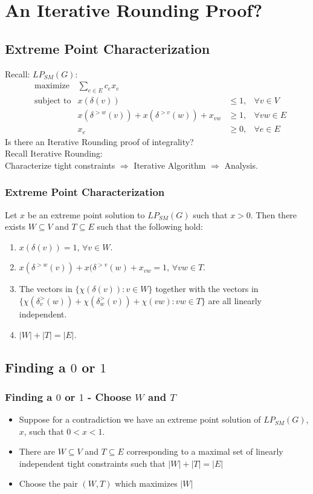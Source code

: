 \documentclass{beamer}
\begin{document}
\section{An Iterative Rounding Proof?}
\subsection{Extreme Point Characterization}
\begin{frame}
Recall: $LP_{SM}(G)$:
\begin{align*}
&\text{maximize} &\sum_{e \in E} c_e x_e \\
&\text{subject to} &x(\delta(v)) &\leq 1, &\forall v \in V\\
& &x(\delta^{>w}(v)) + x(\delta^{>v}(w)) + x_{vw} &\geq 1, &\forall vw \in E\\
& &x_e &\geq 0, &\forall e \in E
\end{align*}
Is there an Iterative Rounding proof of integrality?\\
Recall Iterative Rounding: \\Characterize tight constraints $\Rightarrow$ Iterative Algorithm $\Rightarrow$ Analysis.
\end{frame}

\begin{frame}
\frametitle{Extreme Point Characterization}
Let $x$ be an extreme point solution to $LP_{SM}(G)$ such that $x>0$. Then there exists $W \subseteq V$ and $T \subseteq E$ such that the following hold:
\begin{enumerate}
\item $x(\delta(v)) = 1$, $\forall v \in W$.
\item $x(\delta^{>w}(v))+ x(\delta^{>v}(w) + x_{vw} = 1$, $\forall vw \in T$.
\item The vectors in $\{\chi(\delta(v)) : v \in W\}$ together with the vectors in $\{\chi(\delta_v^>(w)) + \chi(\delta_w^>(v)) + \chi(vw) : vw \in T\}$ are all linearly independent.
\item $|W| + |T| = |E|$.
\end{enumerate}
\end{frame}

\subsection{Finding a $0$ or $1$}

\begin{frame}
\frametitle{Finding a $0$ or $1$ - Choose $W$ and $T$}
\begin{itemize}
\item Suppose for a contradiction we have an extreme point solution of $LP_{SM}(G)$, $x$, such that $0 < x < 1$. 
\item There are $W \subseteq V$ and $T \subseteq E$ corresponding to a maximal set of linearly independent tight constraints such that $|W| + |T| = |E|$
\item Choose the pair $(W,T)$ which  maximizes $|W|$
\end{itemize}
\end{frame}
\end{document}

